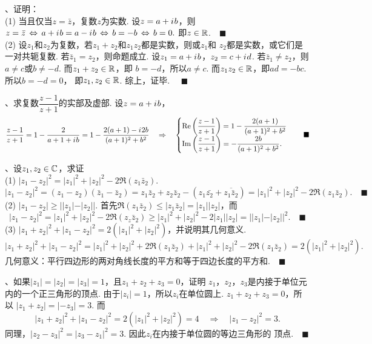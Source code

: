 \vspace{1cm}
\par{}、证明：\\
(1) 当且仅当$z=\bar{z}$，复数$z$为实数.
\proof
  设$z=a+{i\mkern1mu} b$，则
  $
    z=\bar{z}\,\Leftrightarrow\, a+{i\mkern1mu} b = a-{i\mkern1mu} b
    \,\Leftrightarrow\, b = -b \,\Leftrightarrow\, b = 0.
  $
  即$z\in\mathbb{R}$.$\quad\blacksquare$ \\
(2) 设$z_1$和$z_2$为复数，若$z_1+z_2$和$z_1z_2$都是实数，则或$z_1$和
    $z_2$都是实数，或它们是一对共轭复数.
\proof
  若$\bar{z}_1=z_2$，则命题成立. 设$z_1=a+{i\mkern1mu} b$，$z_2=c+{i\mkern1mu} d$.
  若$\bar{z}_1\ne z_2$，则$a\ne c$或$b\ne -d$. 而$z_1+z_2\in\mathbb{R}$，即
  $b = -d$，所以$a\ne c$. 而$z_1z_2\in\mathbb{R}$，即$ad=-bc$. 所以$b=-d=0$，
  即$z_1,z_2\in\mathbb{R}$. 综上，证毕. $\quad\blacksquare$

\vspace{1cm}
\par{}、求复数$\dfrac{z-1}{z+1}$的实部及虚部.
\ans
  设$z=a+{i\mkern1mu} b$，
  \[
    \frac{z-1}{z+1} = 1 - \frac{2}{a+1+{i\mkern1mu} b} =
    1 - \frac{2(a+1) - {i\mkern1mu} 2b}{(a+1)^2 + b^2} \quad\Rightarrow\quad
    \begin{cases}
      \operatorname{Re}\left(\dfrac{z-1}{z+1}\right) = 1-\dfrac{2(a+1)}{(a+1)^2+b^2}\\
      \operatorname{Im}\left(\dfrac{z-1}{z+1}\right) = -\dfrac{2b}{(a+1)^2+b^2}.
    \end{cases}\quad\blacksquare
  \]


\vspace{1cm}
\par{}、设$z_1,z_2\in\mathbb{C}$，求证\\
(1) $|z_1-z_2|^2=|z_1|^2+|z_2|^2-2\Re(z_1\bar{z}_2)$.
\proof
  $
    |z_1-z_2|^2 = (z_1-z_2)(\bar{z}_1-\bar{z}_2) =
    z_1\bar{z}_2 + z_2\bar{z}_2 - (z_1\bar{z_2} + \overline{z_1\bar{z}_2})
    = |z_1|^2 + |z_2|^2 - 2\Re(z_1\bar{z}_2).\quad\blacksquare
  $
(2) $|z_1-z_2| \ge ||z_1| - |z_2||$.
\proof
  首先$\Re(z_1\bar{z}_2) \le |z_1\bar{z}_2| = |z_1||z_2|$，而
  \[
    |z_1-z_2|^2 = |z_1|^2 + |z_2|^2 - 2\Re(z_z\bar{z}_2)
    \ge |z_1|^2 + |z_2|^2 - 2|z_1||z_2| = ||z_1|-|z_2||^2.
    \quad\blacksquare
  \]
(3) $|z_1+z_2|^2 + |z_1-z_2|^2 = 2(|z_1|^2 + |z_2|^2)$，并说明其几何意义.
\proof
  \[
    |z_1+z_2|^2 + |z_1-z_2|^2 = |z_1|^2+|z_2|^2 + 2\Re(z_1\bar{z}_2)
    + |z_1|^2+|z_2|^2 - 2\Re(z_1\bar{z}_2) = 2(|z_1|^2+|z_2|^2).
  \]
  几何意义：平行四边形的两对角线长度的平方和等于四边长度的平方和.$\quad\blacksquare$

\vspace{1cm}
\par{}、如果$|z_1|=|z_2|=|z_3|=1$，且$z_1+z_2+z_3=0$，证明
  $z_1$，$z_2$，$z_3$是内接于单位元内的一个正三角形的顶点.
\proof
  由于$|z_i|=1$，所以$z_i$在单位圆上. $z_1+z_2+z_3 = 0$，所以
  $|z_1+z_2| = |-z_3| = 3$. 而
  \[
    |z_1+z_2|^2+|z_1-z_2|^2 = 2(|z_1|^2+|z_2|^2) = 4
    \quad\Rightarrow\quad
    |z_1-z_2|^2 = 3.
  \]
  同理，$|z_2-z_3|^2=|z_3-z_1|^2=3$. 因此$z_i$在内接于单位圆的等边三角形的
  顶点.$\quad\blacksquare$

